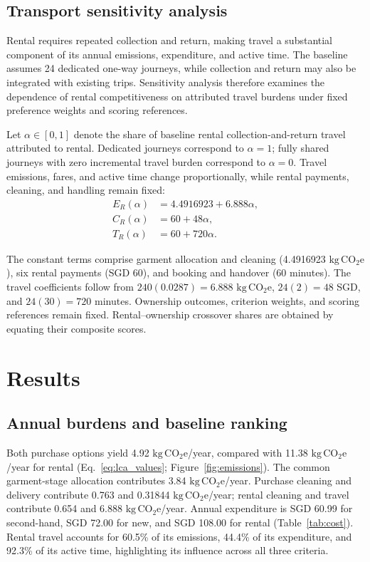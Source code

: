 \documentclass[11pt,a4paper]{article}
\newcommand{\co}{\ensuremath{\mathrm{kg\,CO_2e}}}
\begin{document}
\subsection{Transport sensitivity analysis}
Rental requires repeated collection and return, making travel a substantial component of its annual emissions, expenditure, and active time. The baseline assumes 24 dedicated one-way journeys, while collection and return may also be integrated with existing trips. Sensitivity analysis therefore examines the dependence of rental competitiveness on attributed travel burdens under fixed preference weights and scoring references.

Let $\alpha\in[0,1]$ denote the share of baseline rental collection-and-return travel attributed to rental. Dedicated journeys correspond to $\alpha=1$; fully shared journeys with zero incremental travel burden correspond to $\alpha=0$. Travel emissions, fares, and active time change proportionally, while rental payments, cleaning, and handling remain fixed:
\begin{equation}
\begin{aligned}
E_R(\alpha)&=4.4916923+6.888\alpha,\\
C_R(\alpha)&=60+48\alpha,\\
T_R(\alpha)&=60+720\alpha.
\end{aligned}
\label{eq:transport}
\end{equation}

The constant terms comprise garment allocation and cleaning (4.4916923 \co), six rental payments (SGD 60), and booking and handover (60 minutes). The travel coefficients follow from $240(0.0287)=6.888$ \co, $24(2)=48$ SGD, and $24(30)=720$ minutes. Ownership outcomes, criterion weights, and scoring references remain fixed. Rental--ownership crossover shares are obtained by equating their composite scores.

\section{Results}
\subsection{Annual burdens and baseline ranking}
Both purchase options yield 4.92 \co/year, compared with 11.38 \co/year for rental (Eq.~\ref{eq:lca_values}; Figure~\ref{fig:emissions}). The common garment-stage allocation contributes 3.84 \co/year. Purchase cleaning and delivery contribute 0.763 and 0.31844 \co/year; rental cleaning and travel contribute 0.654 and 6.888 \co/year. Annual expenditure is SGD 60.99 for second-hand, SGD 72.00 for new, and SGD 108.00 for rental (Table~\ref{tab:cost}). Rental travel accounts for 60.5\% of its emissions, 44.4\% of its expenditure, and 92.3\% of its active time, highlighting its influence across all three criteria.
\end{document}
